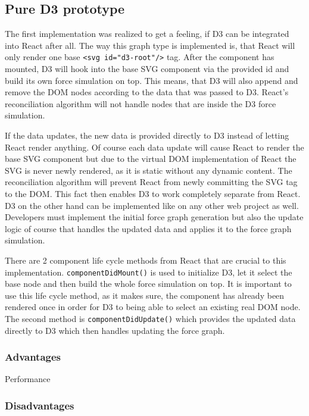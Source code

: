 \subsection{Pure D3 prototype}

The first implementation was realized to get a feeling, if D3 can be integrated into React after all. The way this graph type is implemented is, that React will only render one base \texttt{<svg id="d3-root"/>} tag. After the component has mounted, D3 will hook into the base SVG component via the provided id and build its own force simulation on top. This means, that D3 will also append and remove the DOM nodes according to the data that was passed to D3. React's reconciliation algorithm will not handle nodes that are inside the D3 force simulation.

If the data updates, the new data is provided directly to D3 instead of letting React render anything. Of course each data update will cause React to render the base SVG component but due to the virtual DOM implementation of React the SVG is never newly rendered, as it is static without any dynamic content. The reconciliation algorithm will prevent React from newly committing the SVG tag to the DOM. This fact then enables D3 to work completely separate from React. D3 on the other hand can be implemented like on any other web project as well. Developers must implement the initial force graph generation but also the update logic of course that handles the updated data and applies it to the force graph simulation.

There are 2 component life cycle methods from React that are crucial to this implementation. \texttt{componentDidMount()} is used to initialize D3, let it select the base node and then build the whole force simulation on top. It is important to use this life cycle method, as it makes sure, the component has already been rendered once in order for D3 to being able to select an existing real DOM node. The second method is \texttt{componentDidUpdate()} which provides the updated data directly to D3 which then handles updating the force graph. 

\subsubsection{Advantages}

Performance

\subsubsection{Disadvantages}

